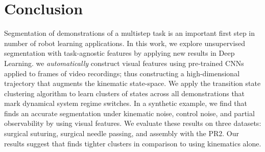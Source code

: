 \section{Conclusion}
Segmentation of demonstrations of a multistep task is an important first step in number of robot learning applications.
In this work, we explore unsupervised segmentation with task-agnostic features by applying new results in Deep Learning.
we \emph{automatically} construct visual features using pre-trained CNNs applied to frames of video recordings; thus constructing a high-dimensional trajectory that augments the kinematic state-space.
We apply the transition state clustering algorithm to learn clusters of states across all demonstrations that mark dynamical system regime switches.
In a synthetic example, we find that \tsc finds an accurate segmentation under kinematic noise, control noise, and partial observability by using visual features. 
We evaluate these results on three datasets: surgical suturing, surgical needle passing, and assembly with the PR2.
Our results suggest that \tsc finds  tighter clusters in comparison to using kinematics alone.
